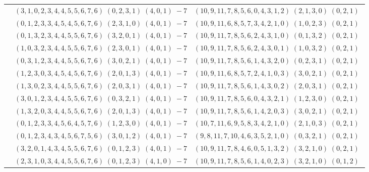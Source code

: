 \documentclass[11pt]{article}
\begin{document}
\begin{longtable}[l]{|c|c|c|}
 \cline{2-3} 
 & $(3 ,1 ,0 ,2 ,3 ,4 ,4 ,5 ,5 ,6 ,7 ,6) \;(0 ,2 ,3 ,1) \;(4 ,0 ,1) \;-7$ & $(10 ,9 ,11 ,7 ,8 ,5 ,6 ,0 ,4 ,3 ,1 ,2) \;(2 ,1 ,3 ,0) \;(0 ,2 ,1) \;$\\ 
 \cline{2-3} 
 & $(0 ,1 ,2 ,3 ,3 ,4 ,5 ,4 ,5 ,6 ,7 ,6) \;(2 ,3 ,1 ,0) \;(4 ,0 ,1) \;-7$ & $(10 ,9 ,11 ,6 ,8 ,5 ,7 ,3 ,4 ,2 ,1 ,0) \;(1 ,0 ,2 ,3) \;(0 ,2 ,1) \;$\\ 
 \cline{2-3} 
 & $(0 ,1 ,3 ,2 ,3 ,4 ,4 ,5 ,5 ,6 ,7 ,6) \;(3 ,2 ,0 ,1) \;(4 ,0 ,1) \;-7$ & $(10 ,9 ,11 ,7 ,8 ,5 ,6 ,2 ,4 ,3 ,1 ,0) \;(0 ,1 ,3 ,2) \;(0 ,2 ,1) \;$\\ 
 \cline{2-3} 
 & $(1 ,0 ,3 ,2 ,3 ,4 ,4 ,5 ,5 ,6 ,7 ,6) \;(2 ,3 ,0 ,1) \;(4 ,0 ,1) \;-7$ & $(10 ,9 ,11 ,7 ,8 ,5 ,6 ,2 ,4 ,3 ,0 ,1) \;(1 ,0 ,3 ,2) \;(0 ,2 ,1) \;$\\ 
 \cline{2-3} 
 & $(0 ,3 ,1 ,2 ,3 ,4 ,4 ,5 ,5 ,6 ,7 ,6) \;(3 ,0 ,2 ,1) \;(4 ,0 ,1) \;-7$ & $(10 ,9 ,11 ,7 ,8 ,5 ,6 ,1 ,4 ,3 ,2 ,0) \;(0 ,2 ,3 ,1) \;(0 ,2 ,1) \;$\\ 
 \cline{2-3} 
 & $(1 ,2 ,3 ,0 ,3 ,4 ,5 ,4 ,5 ,6 ,7 ,6) \;(2 ,0 ,1 ,3) \;(4 ,0 ,1) \;-7$ & $(10 ,9 ,11 ,6 ,8 ,5 ,7 ,2 ,4 ,1 ,0 ,3) \;(3 ,0 ,2 ,1) \;(0 ,2 ,1) \;$\\ 
 \cline{2-3} 
 & $(1 ,3 ,0 ,2 ,3 ,4 ,4 ,5 ,5 ,6 ,7 ,6) \;(2 ,0 ,3 ,1) \;(4 ,0 ,1) \;-7$ & $(10 ,9 ,11 ,7 ,8 ,5 ,6 ,1 ,4 ,3 ,0 ,2) \;(2 ,0 ,3 ,1) \;(0 ,2 ,1) \;$\\ 
 \cline{2-3} 
 & $(3 ,0 ,1 ,2 ,3 ,4 ,4 ,5 ,5 ,6 ,7 ,6) \;(0 ,3 ,2 ,1) \;(4 ,0 ,1) \;-7$ & $(10 ,9 ,11 ,7 ,8 ,5 ,6 ,0 ,4 ,3 ,2 ,1) \;(1 ,2 ,3 ,0) \;(0 ,2 ,1) \;$\\ 
 \cline{2-3} 
 & $(1 ,3 ,2 ,0 ,3 ,4 ,4 ,5 ,5 ,6 ,7 ,6) \;(2 ,0 ,1 ,3) \;(4 ,0 ,1) \;-7$ & $(10 ,9 ,11 ,7 ,8 ,5 ,6 ,1 ,4 ,2 ,0 ,3) \;(3 ,0 ,2 ,1) \;(0 ,2 ,1) \;$\\ 
 \cline{2-3} 
 & $(0 ,1 ,2 ,3 ,3 ,4 ,5 ,6 ,4 ,5 ,7 ,6) \;(1 ,2 ,3 ,0) \;(4 ,0 ,1) \;-7$ & $(10 ,7 ,11 ,6 ,9 ,5 ,8 ,3 ,4 ,2 ,1 ,0) \;(2 ,1 ,0 ,3) \;(0 ,2 ,1) \;$\\ 
 \cline{2-3} 
 & $(0 ,1 ,2 ,3 ,4 ,3 ,4 ,5 ,6 ,7 ,5 ,6) \;(3 ,0 ,1 ,2) \;(4 ,0 ,1) \;-7$ & $(9 ,8 ,11 ,7 ,10 ,4 ,6 ,3 ,5 ,2 ,1 ,0) \;(0 ,3 ,2 ,1) \;(0 ,2 ,1) \;$\\ 
 \cline{2-3} 
 & $(3 ,2 ,0 ,1 ,4 ,3 ,4 ,5 ,5 ,6 ,7 ,6) \;(0 ,1 ,2 ,3) \;(4 ,0 ,1) \;-7$ & $(10 ,9 ,11 ,7 ,8 ,4 ,6 ,0 ,5 ,1 ,3 ,2) \;(3 ,2 ,1 ,0) \;(0 ,2 ,1) \;$\\ 
 \cline{2-3} 
 & $(2 ,3 ,1 ,0 ,3 ,4 ,4 ,5 ,5 ,6 ,7 ,6) \;(0 ,1 ,2 ,3) \;(4 ,1 ,0) \;-7$ & $(10 ,9 ,11 ,7 ,8 ,5 ,6 ,1 ,4 ,0 ,2 ,3) \;(3 ,2 ,1 ,0) \;(0 ,1 ,2) \;$\\ 

\end{longtable}
\end{document}
